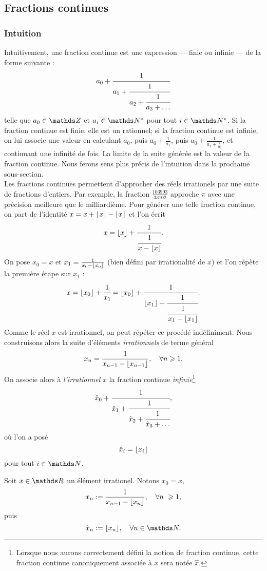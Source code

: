 \subsection{Fractions continues}
\subsubsection{Intuition}

Intuitivement, une fraction continue est une expression — finie ou infinie — de
la forme suivante : \[a_0 + \cfrac{1}{a_1 + \cfrac{1}{a_2 + \cfrac{1}{a_3 +
\dots}}}\] telle que $a_0\in \Z$ et $a_i \in \N^*$ pour tout $i\in \N^*$.  Si
la fraction continue est finie, elle est un rationnel; si la fraction continue
est infinie, on lui associe une valeur en calculant $a_0$, puis $a_0 +
\frac{1}{a_1}$, puis $a_0 + \frac{1}{a_1 +\frac{1}{a_2}}$, et continuant une
infinité de fois. La limite de la suite générée est la \og{} valeur \fg{} de la
fraction continue. Nous ferons sens plus précis de l'intuition dans la
prochaine sous-section. \\

Les fractions continues permettent d'approcher des réels irrationels par une
suite de fractions d'entiers.  Par exemple, la fraction $\frac{103 993}{33
102}$ approche $\pi$ avec une précision meilleure que le milliardième. Pour
générer une telle fraction continue, on part de l'identité $x = x + \lfloor x\rfloor -
\lfloor x\rfloor$ et l'on écrit \[x = \lfloor x\rfloor + \cfrac{1}{\cfrac{1}{x - \lfloor x\rfloor}}.\] On
pose $x_0 = x$ et $x_1 = \frac{1}{x_0 - \lfloor x_0\rfloor}$ (bien défini par
irrationalité de $x$) et l'on répète la première étape sur $x_1$ : \[x =
\lfloor x_0\rfloor + \cfrac{1}{x_1} = \lfloor x_0\rfloor + \cfrac{1}{\lfloor x_1\rfloor +
\cfrac{1}{\cfrac{1}{x_1 - \lfloor x_1\rfloor}}}.\] Comme le réel $x$ est irrationnel, on
peut répéter ce procédé indéfiniment. Nous construisons alors la suite
d'éléments \emph{irrationnels} de terme général \[x_n = \frac{1}{x_{n-1} -
\lfloor x_{n-1}\rfloor}, \quad \forall n \geqslant 1.\] On associe alors à
\emph{l'irrationnel} $x$ la fraction continue \emph{infinie}\footnote{Lorsque
nous aurons correctement défini la notion de fraction continue, cette fraction
continue canoniquement associée à $x$ sera notée $\hat{x}$.} \[\hat{x}_0 +
\cfrac{1}{\hat{x}_1 + \cfrac{1}{\hat{x}_2 + \cfrac{1}{\hat{x}_3 + \dots}}},\]
où l'on a posé \[\hat{x}_i = \lfloor x_i\rfloor\] pour tout $i\in \N$.

\begin{notation}\label{notations} Soit $x\in \R$ un élément irrationel. Notons
$x_0 = x$, \[x_n := \frac{1}{x_{n-1} - \ent{x_n}}, \quad \forall n \geq 1,\]
puis \[\hat{x}_n := \ent{x_n}, \quad \forall n\in \N.\] \end{notation}


